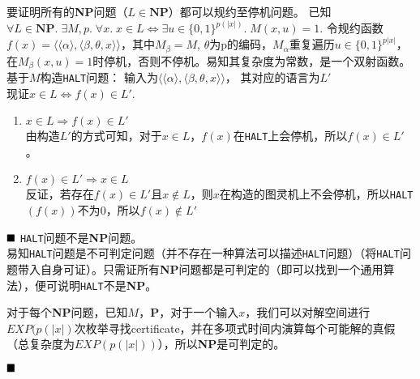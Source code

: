 \documentclass[11pt,largemargins]{homework}
\renewcommand{\qed}{$\hfill\blacksquare$}
\begin{document}
\maketitle


\begin{alphaparts}
  \questionpart
  要证明所有的\textbf{NP}问题（$L\in \textbf{NP}$）都可以规约至停机问题。\newline
  已知$\forall L\in \textbf{NP}.\;\exists M,p.\;\forall x.\;x\in L \Leftrightarrow \exists u\in \{0,1\}^{p(|x|)}.\;M(x,u)=1.$\newline
  令规约函数$f(x) = \langle\langle\alpha\rangle, \langle\beta, \theta, x\rangle\rangle$，其中$M_\beta = M$, $\theta$为p的编码，$M_\alpha$重复遍历$u\in\{0,1\}^{p|x|}$，在$M_{\beta}(x, u) = 1$时停机，否则不停机。易知其复杂度为常数，是一个双射函数。\\
  基于$M$构造\texttt{HALT}问题：
  输入为$\langle\langle\alpha\rangle,\langle\beta, \theta, x\rangle\rangle$， 其对应的语言为$L'$\\
  现证$x\in{L}\Leftrightarrow f(x)\in {L'}$.
  \begin{enumerate}
    \item $x\in L\Rightarrow f(x)\in L'$\\
          由构造$L'$的方式可知，对于$x\in L$，$f(x)$在\texttt{HALT}上会停机，所以$f(x)\in L'$。
    \item $f(x)\in L'\Rightarrow x\in L$\\ 
          反证，若存在$f(x)\in L'$且$x\not\in L$，则$x$在构造的图灵机上不会停机，所以\texttt{HALT}$(f(x))$不为$0$，所以$f(x)\not\in L'$
  \end{enumerate}\qed
  \questionpart
  \texttt{HALT}问题不是\textbf{NP}问题。\\
  易知\texttt{HALT}问题是不可判定问题（并不存在一种算法可以描述\texttt{HALT}问题）（将\texttt{HALT}问题带入自身可证）。只需证所有\textbf{NP}问题都是可判定的（即可以找到一个通用算法），便可说明\texttt{HALT}不是\textbf{NP}。

  对于每个\textbf{NP}问题，已知$M$，\textbf{P}，对于一个输入$x$，我们可以对解空间进行$EXP(p(|x|)$次枚举寻找certificate，并在多项式时间内演算每个可能解的真假（总复杂度为$EXP(p(|x|))$），所以\textbf{NP}是可判定的。
  
  \qed
\end{alphaparts}
\end{document}
